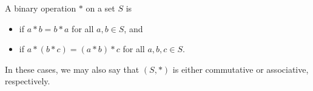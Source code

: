 \documentclass[11pt,fleqn,dvipsnames,usenames]{article}
\newcommand{\p}{\noindent}
\begin{document}
\begin{definition}
A binary operation $*$ on a set $S$ is
\begin{itemize}
\item {} if $a*b = b*a$ for all $a,b\in S$, and
\item {} if $a*(b*c) = (a*b)*c$ for all $a,b,c\in S$.
\end{itemize}
\p In these cases, we may also say that $(S,*)$ is either commutative or associative, respectively.
\end{definition}

%
\begin{examples*}~
\end{examples*}
\end{document}
